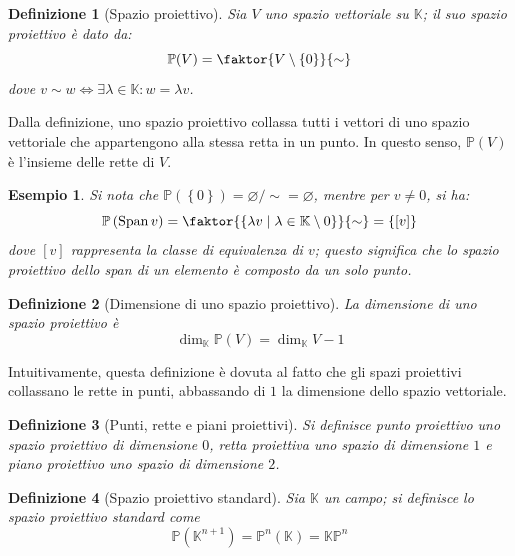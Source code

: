 \documentclass[12pt]{scrartcl}
\theoremstyle{style}
\newtheorem{esempio}{Esempio}[section]
\newtheorem{definizione}{Definizione}[section]
\numberwithin{equation}{subsection}
\begin{document}
\begin{definizione}
	[Spazio proiettivo]
	Sia $V$ uno spazio vettoriale su $\mathbb{K}$; il suo \textit{spazio proiettivo} \`e dato da:
	\[
		\mathbb{P}( V) = \faktor{V \setminus \left\{ 0 \right\} }{\sim}
	\] 
	dove $v\sim w \iff \exists \lambda \in \mathbb{K} : w = \lambda v$.
\end{definizione}
\noindent Dalla definizione, uno spazio proiettivo collassa tutti i vettori di uno spazio vettoriale che appartengono alla stessa retta in un punto.
In questo senso, $\mathbb{P} (V)$ \`e l'insieme delle rette di $V$.
\begin{esempio}
Si nota che $\mathbb{P} \left(\left\{ 0 \right\} \right) = \varnothing / {\sim} = \varnothing$, mentre per $v\neq 0$, si ha:
\[
	\mathbb{P}\left(\operatorname{Span} v\right) = \faktor{\left\{ \lambda v  \mid \lambda \in \mathbb{K}\setminus 0 \right\} }{\sim} = \left\{ \left[ v \right]  \right\} 
\] 
dove $\left[ v \right] $ rappresenta la classe di equivalenza di $v$; questo significa che lo spazio proiettivo dello span di un elemento \`e composto da un solo punto.
\end{esempio}
\begin{definizione}
	[Dimensione di uno spazio proiettivo]
	La dimensione di uno spazio proiettivo \`e
	\[
	\dim_{\mathbb{K}} \mathbb{P}(V) = \dim_{\mathbb{K}} V - 1
	\] 
\end{definizione}
\noindent Intuitivamente, questa definizione \`e dovuta al fatto che gli spazi proiettivi collassano le rette in punti, abbassando di $1$ la dimensione dello spazio vettoriale.

\begin{definizione}
	[Punti, rette e piani proiettivi]
	Si definisce \textit{punto proiettivo} uno spazio proiettivo di dimensione $0$, \textit{retta proiettiva} uno spazio di dimensione $1$ e \textit{piano proiettivo} uno spazio di dimensione $2$.
\end{definizione}
\begin{definizione}
	[Spazio proiettivo standard]
	Sia $\mathbb{K}$ un campo; si definisce lo \textit{spazio proiettivo standard} come
	\[
	\mathbb{P}(\mathbb{K}^{n+1} ) = \mathbb{P}^n(\mathbb{K}) = \mathbb{K}\mathbb{P}^n
	\] 
\end{definizione}
\end{document}
